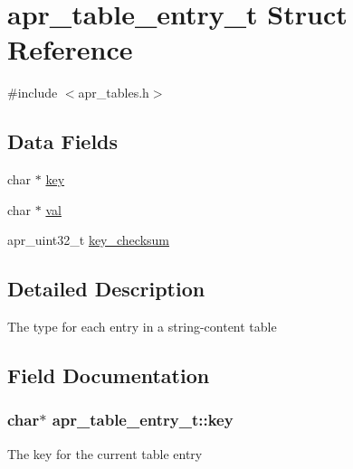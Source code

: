 \hypertarget{structapr__table__entry__t}{}\section{apr\+\_\+table\+\_\+entry\+\_\+t Struct Reference}
\label{structapr__table__entry__t}


{\ttfamily \#include $<$apr\+\_\+tables.\+h$>$}

\subsection*{Data Fields}
\begin{DoxyCompactItemize}
\item 
char $\ast$ \hyperlink{structapr__table__entry__t_abdccb35ea49dd95082fdce65a5a6001f}{key}
\item 
char $\ast$ \hyperlink{structapr__table__entry__t_a755371d0aa6a9487b502c34807271e6f}{val}
\item 
apr\+\_\+uint32\+\_\+t \hyperlink{structapr__table__entry__t_a0c51574420b6cc7bc6c2e35710e0ad3a}{key\+\_\+checksum}
\end{DoxyCompactItemize}


\subsection{Detailed Description}
The type for each entry in a string-\/content table 

\subsection{Field Documentation}
\subsubsection[{\texorpdfstring{key}{key}}]{\setlength{\rightskip}{0pt plus 5cm}char$\ast$ apr\+\_\+table\+\_\+entry\+\_\+t\+::key}\hypertarget{structapr__table__entry__t_abdccb35ea49dd95082fdce65a5a6001f}{}\label{structapr__table__entry__t_abdccb35ea49dd95082fdce65a5a6001f}
The key for the current table entry 

